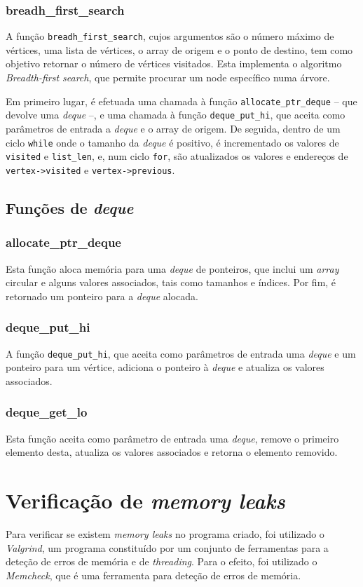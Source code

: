 \documentclass[portuguese,11pt,a4paper,titlepage]{article}
\newcommand{\foreign}[1]{\textit{#1}}
\begin{document}
\subsubsection{breadh\_first\_search}
A função \verb|breadh_first_search|, cujos argumentos são o número máximo de vértices, uma lista de vértices, o array de origem e o ponto de destino, tem como objetivo retornar o número de vértices visitados. Esta implementa o algoritmo \textit{Breadth-first search}, que permite procurar um node específico numa árvore.

Em primeiro lugar, é efetuada uma chamada à função \verb|allocate_ptr_deque| -- que devolve uma \textit{deque} --, e uma chamada à função \verb|deque_put_hi|, que aceita como parâmetros de entrada a \textit{deque} e o array de origem. De seguida, dentro de um ciclo \verb|while| onde o tamanho da \textit{deque} é positivo, é incrementado os valores de \verb|visited| e \verb|list_len|, e, num ciclo \verb|for|, são atualizados os valores e endereços de \verb|vertex->visited| e \verb|vertex->previous|.

\subsection{Funções de \textit{deque}}
\subsubsection{allocate\_ptr\_deque}
Esta função aloca memória para uma \textit{deque} de ponteiros, que inclui um \textit{array} circular e alguns valores associados, tais como tamanhos e índices. Por fim, é retornado um ponteiro para a \textit{deque} alocada.

\subsubsection{deque\_put\_hi}
A função \verb|deque_put_hi|, que aceita como parâmetros de entrada uma \textit{deque} e um ponteiro para um vértice, adiciona o ponteiro à \textit{deque} e atualiza os valores associados.

\subsubsection{deque\_get\_lo}
Esta função aceita como parâmetro de entrada uma \textit{deque}, remove o primeiro elemento desta, atualiza os valores associados e retorna o elemento removido.

\pagebreak
\section{Verificação de \textit{memory leaks}}
Para verificar se existem \textit{memory leaks} no programa criado, foi utilizado o \foreign{Valgrind}, um programa constituído por um conjunto de ferramentas para a deteção de erros de memória e de \foreign{threading}. Para o efeito, foi utilizado o \foreign{Memcheck}, que é uma ferramenta para deteção de erros de memória.
\end{document}
